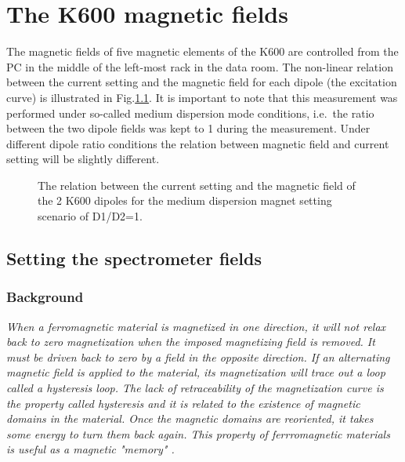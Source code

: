 \documentclass[11pt]{report}
\begin{document}
\newpage
\chapter{The K600 magnetic fields}


The magnetic fields of five magnetic elements of the K600
are controlled from the PC in the middle of the left-most rack in the data room.
The non-linear relation between the current setting and the magnetic field for each dipole (the excitation curve)
is illustrated in Fig.\ref{fig:spectrometer-fields}. 
It is important to note that this measurement was performed under so-called medium dispersion mode
conditions, i.e.~the ratio between the two dipole fields was kept to 1 during the measurement. 
Under different dipole ratio conditions the relation between magnetic field and current setting will be slightly different.

\begin{figure}[!ht]
\centerline{\vspace{0cm}\hspace{0cm}
 }
\centering
\caption{The relation between the current setting and the magnetic field of the 2 K600 dipoles
for the medium dispersion magnet setting scenario of D1/D2=1. }
\label{fig:spectrometer-fields}
\end{figure} 


\section{Setting the spectrometer fields}\label{sec:Setting-the-spectrometer-fields}

\subsection{Background}

{\it When a ferromagnetic material is magnetized in one direction, it will not relax back to zero magnetization when the imposed magnetizing field is removed. It must be driven back to zero by a field in the opposite direction. If an alternating magnetic field is applied to the material, its magnetization will trace out a loop called a hysteresis loop. The lack of retraceability of the magnetization curve is the property called hysteresis and it is related to the existence of  magnetic domains in the material. Once the magnetic domains are reoriented, it takes some energy to turn them back again. This property of ferrromagnetic materials is useful as a magnetic "memory" \cite{web10}.}
\end{document}
